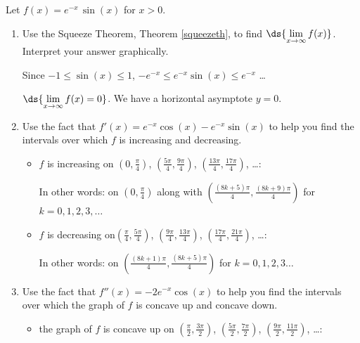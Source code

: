 \documentclass{ximera}
\begin{document}
\begin{problem} Let $f(x) = e^{-x} \, \sin(x)$ for $x > 0$.

\begin{enumerate}

\item  Use the Squeeze Theorem, Theorem \ref{squeezeth},  to find $\ds{\lim_{x \rightarrow \infty} f(x)}$.  Interpret your answer graphically.

\begin{hint}
Since $-1 \leq \sin (x)  \leq 1$, $-e^{-x} \leq   e^{-x}   \sin (x)   \leq e^{-x}$ \ldots
\end{hint}

\begin{solution}
$\ds{\lim_{x \rightarrow \infty} f(x) = 0}$.  We have a horizontal asymptote $y = 0$. 
\end{solution}

\item  Use the fact that  $f'(x) = e^{-x} \cos(x) - e^{-x} \sin(x)$ to help you find the intervals over which $f$ is increasing and decreasing.

\begin{solution}
\begin{itemize} \item $f$ is increasing on $\left(0, \frac{\pi}{4} \right)$, $\left(\frac{5\pi}{4}, \frac{9 \pi}{4} \right)$, $\left(\frac{13\pi}{4}, \frac{17 \pi}{4} \right)$, \ldots :  

In other words: on $\left(0, \frac{\pi}{4} \right)$ along with $\left( \frac{(8k+5) \pi}{4}, \frac{(8k+9)\pi}{4}\right)$ for $k = 0, 1, 2, 3, \ldots$

\item $f$ is decreasing on$\left(\frac{\pi}{4}, \frac{5 \pi}{4} \right)$, $\left(\frac{9\pi}{4}, \frac{13 \pi}{4} \right)$, $\left(\frac{17\pi}{4}, \frac{21\pi}{4} \right)$, \ldots : 

In other words:  on $\left( \frac{(8k+1) \pi}{4}, \frac{(8k+5)\pi}{4}\right)$ for $k  = 0, 1, 2, 3 \ldots$

\end{itemize}
\end{solution}

\item  Use the fact that $f''(x) = -2 e^{-x} \cos(x)$ to help you find the intervals over which the graph of $f$ is concave up and concave down.

\begin{solution}
\begin{itemize} \item the graph of $f$ is concave up on $\left(\frac{\pi}{2}, \frac{3\pi}{2} \right)$, $\left(\frac{5\pi}{2}, \frac{7 \pi}{2} \right)$, $\left(\frac{9\pi}{2}, \frac{11 \pi}{2} \right)$, \ldots :  


\end{itemize}
\end{solution}
\end{enumerate}
\end{problem}
\end{document}
